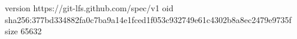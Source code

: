 version https://git-lfs.github.com/spec/v1
oid sha256:377bd334882fa0c7ba9a14e1fced1f053c932749e61c4302b8a8ec2479e9735f
size 65632
